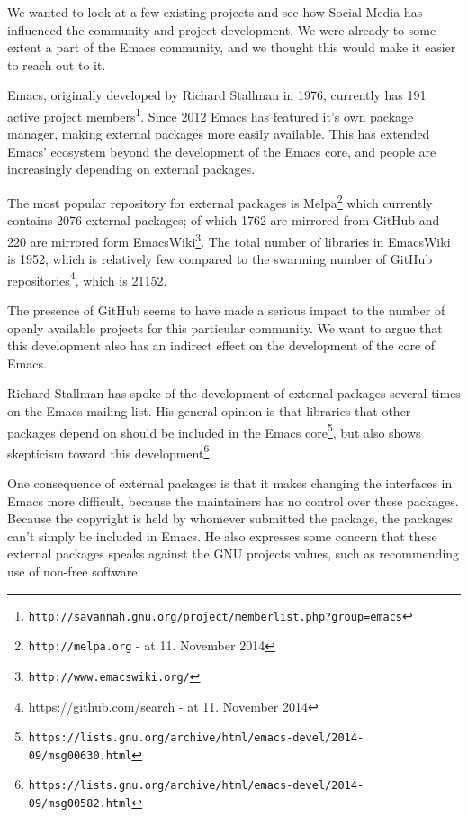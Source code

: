 \documentclass[a4paper,11pt]{article} %
\begin{document}
We wanted to look at a few existing projects and see how Social Media has
influenced the community and project development. We were already to some
extent a part of the Emacs community, and we thought this would make it
easier to reach out to it.

Emacs, originally developed by Richard Stallman in 1976, currently has
\num{191} active project
members\footnote{\texttt{http://savannah.gnu.org/project/memberlist.php?group=emacs}}.
Since \num{2012} Emacs has featured it's own package manager, making
external packages more easily available. This has extended Emacs' ecosystem
beyond the development of the Emacs core, and people are increasingly
depending on external packages.

The most popular repository for external packages is
Melpa\footnote{\texttt{http://melpa.org} - at 11. November 2014} which
currently contains \num{2076} external packages; of which \num{1762} are
mirrored from GitHub and \num{220} are mirrored form
EmacsWiki\footnote{\texttt{http://www.emacswiki.org/}}. The total number of
libraries in EmacsWiki is \num{1952}, which is relatively few compared to
the swarming number of GitHub
repositories\footnote{\href{https://github.com/search?utf8=\%E2\%9C\%93\&q=language\%3Aemacs-lisp\&type=Repositories\&ref=searchresults}{https://github.com/search}
  - at 11. November 2014}, which is \num{21152}.

The presence of GitHub seems to have made a serious impact to the number of
openly available projects for this particular community. We want to argue
that this development also has an indirect effect on the development of the
core of Emacs.

Richard Stallman has spoke of the development of external packages several
times on the Emacs mailing list. His general opinion is that libraries that
other packages depend on should be included in the Emacs
core\footnote{\texttt{https://lists.gnu.org/archive/html/emacs-devel/2014-09/msg00630.html}},
but also shows skepticism toward this
development\footnote{\texttt{https://lists.gnu.org/archive/html/emacs-devel/2014-09/msg00582.html}}. 

One consequence of external packages is that it makes changing the
interfaces in Emacs more difficult, because the maintainers has no control
over these packages. Because the copyright is held by whomever submitted the
package, the packages can't simply be included in Emacs. He also expresses
some concern that these external packages speaks against the GNU projects
values, such as recommending use of non-free software.
\end{document}
